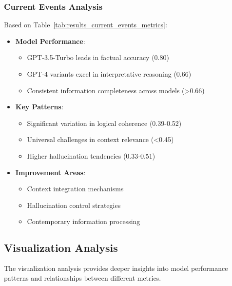 \subsubsection{Current Events Analysis}
Based on Table~\ref{tab:results_current_events_metrics}:
\begin{itemize}
    \item \textbf{Model Performance}:
    \begin{itemize}
        \item GPT-3.5-Turbo leads in factual accuracy (0.80)
        \item GPT-4 variants excel in interpretative reasoning (0.66)
        \item Consistent information completeness across models (>0.66)
    \end{itemize}
    \item \textbf{Key Patterns}:
    \begin{itemize}
        \item Significant variation in logical coherence (0.39-0.52)
        \item Universal challenges in context relevance (<0.45)
        \item Higher hallucination tendencies (0.33-0.51)
    \end{itemize}
    \item \textbf{Improvement Areas}:
    \begin{itemize}
        \item Context integration mechanisms
        \item Hallucination control strategies
        \item Contemporary information processing
    \end{itemize}
\end{itemize}

\subsection{Visualization Analysis}
The visualization analysis provides deeper insights into model performance patterns and relationships between different metrics.


